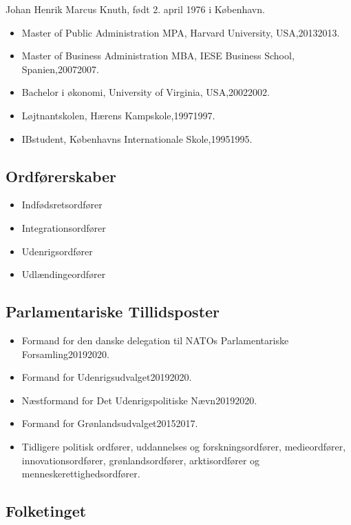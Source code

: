 \documentclass[11pt, a4paper]{awesome-cv}
\begin{document}
\makecvheader[R]
\makelettertitle
\begin{cvletter}
Johan Henrik Marcus Knuth, født 2. april 1976 i København.

\begin{itemize}
\item Master of Public Administration MPA, Harvard University, USA,20132013.
\item Master of Business Administration MBA, IESE Business School, Spanien,20072007.
\item Bachelor i økonomi, University of Virginia, USA,20022002.
\item Løjtnantskolen, Hærens Kampskole,19971997.
\item IBstudent, Københavns Internationale Skole,19951995.
\end{itemize}
\subsection*{Ordførerskaber}
\begin{itemize}
\item Indfødsretsordfører
\item Integrationsordfører
\item Udenrigsordfører
\item Udlændingeordfører
\end{itemize}
\subsection*{Parlamentariske Tillidsposter}
\begin{itemize}
\item Formand for den danske delegation til NATOs Parlamentariske Forsamling20192020.
\item Formand for Udenrigsudvalget20192020.
\item Næstformand for Det Udenrigspolitiske Nævn20192020.
\item Formand for Grønlandsudvalget20152017.
\item Tidligere politisk ordfører, uddannelses og forskningsordfører, medieordfører, innovationsordfører, grønlandsordfører, arktisordfører og menneskerettighedsordfører.
\end{itemize}
\subsection*{Folketinget}

\end{cvletter}
\end{document}
